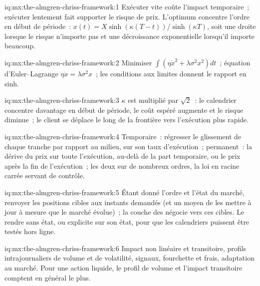 \begin{solution}{iq:mx:the-almgren-chriss-framework:1}
Exécuter vite coûte l'impact temporaire~; exécuter lentement fait supporter le risque de prix. L'optimum concentre l'ordre en début de période~: $x(t)=X\sinh(\kappa(T-t))/\sinh(\kappa T)$, soit une
droite lorsque le risque n'importe pas et une décroissance exponentielle lorsqu'il importe beaucoup.
\end{solution}

\begin{solution}{iq:mx:the-almgren-chriss-framework:2}
Minimiser $\int(\eta\dot x^2+\lambda\sigma^2x^2)dt$~; équation d'Euler--Lagrange $\eta\ddot x=\lambda\sigma^2x$~; les conditions aux limites donnent le rapport en sinh.
\end{solution}

\begin{solution}{iq:mx:the-almgren-chriss-framework:3}
$\kappa$ est multiplié par $\sqrt2$~: le calendrier concentre davantage en début de période, le coût espéré augmente et le risque diminue~; le client se déplace le long de la frontière vers l'exécution plus rapide.
\end{solution}

\begin{solution}{iq:mx:the-almgren-chriss-framework:4}
Temporaire~: régresser le glissement de chaque tranche par rapport au milieu, sur son taux d'exécution~; permanent~: la dérive du prix sur toute l'exécution, au-delà de la
part temporaire, ou le prix après la fin de l'exécution~; les deux sur de nombreux ordres, la loi en racine carrée servant de contrôle.
\end{solution}

\begin{solution}{iq:mx:the-almgren-chriss-framework:5}
Étant donné l'ordre et l'état du marché, renvoyer les positions cibles aux instants demandés (et un moyen de les mettre à jour à mesure que le marché évolue)~; la couche des  négocie vers ces cibles. Le rendre sans état, ou explicite sur son état, pour que les calendriers puissent être testés hors ligne.
\end{solution}

\begin{solution}{iq:mx:the-almgren-chriss-framework:6}
Impact non linéaire et transitoire, profils intrajournaliers de volume et de volatilité, signaux, fourchette et frais, adaptation au marché. Pour une action liquide, le
profil de volume et l'impact transitoire comptent en général le plus.
\end{solution}
